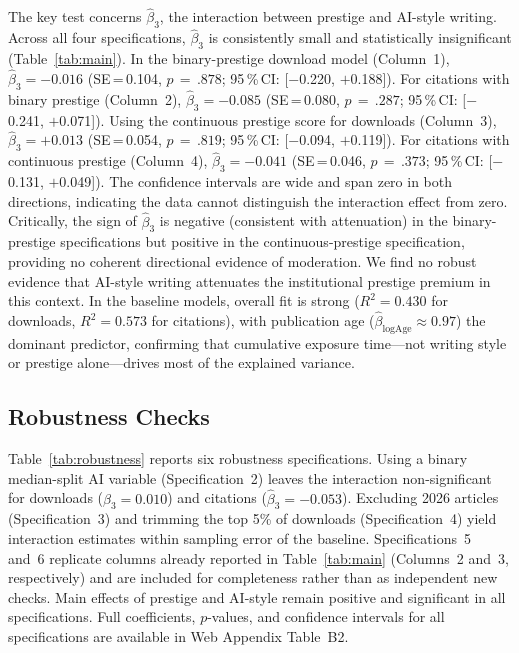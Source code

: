 \documentclass[12pt,a4paper]{article}
\begin{document}
The key test concerns $\hat{\beta}_3$, the interaction between prestige
and AI-style writing.
Across all four specifications, $\hat{\beta}_3$ is consistently small
and statistically insignificant (Table~\ref{tab:main}).
In the binary-prestige download model (Column~1),
$\hat{\beta}_3 = -0.016$ (SE\,=\,0.104, $p\,=\,.878$;
95\,\%\,CI: [$-$0.220, $+$0.188]).
For citations with binary prestige (Column~2),
$\hat{\beta}_3 = -0.085$ (SE\,=\,0.080, $p\,=\,.287$;
95\,\%\,CI: [$-$0.241, $+$0.071]).
Using the continuous prestige score for downloads (Column~3),
$\hat{\beta}_3 = +0.013$ (SE\,=\,0.054, $p\,=\,.819$;
95\,\%\,CI: [$-$0.094, $+$0.119]).
For citations with continuous prestige (Column~4),
$\hat{\beta}_3 = -0.041$ (SE\,=\,0.046, $p\,=\,.373$;
95\,\%\,CI: [$-$0.131, $+$0.049]).
The confidence intervals are wide and span zero in both directions,
indicating the data cannot distinguish the interaction effect from zero.
Critically, the sign of $\hat{\beta}_3$ is negative (consistent with
attenuation) in the binary-prestige specifications but positive in the
continuous-prestige specification, providing no coherent directional
evidence of moderation.
We find no robust evidence that AI-style writing attenuates the
institutional prestige premium in this context.
In the baseline models, overall fit is strong ($R^2 = 0.430$ for
downloads, $R^2 = 0.573$ for citations), with publication age
($\hat{\beta}_{\log\text{Age}}\approx 0.97$) the dominant predictor,
confirming that cumulative exposure time---not writing style or
prestige alone---drives most of the explained variance.

\subsection{Robustness Checks}

Table~\ref{tab:robustness} reports six robustness specifications.
Using a binary median-split AI variable (Specification~2) leaves
the interaction non-significant for downloads
($\hat{\beta}_3 = 0.010$) and citations ($\hat{\beta}_3 = -0.053$).
Excluding 2026 articles (Specification~3) and trimming the top 5\%
of downloads (Specification~4) yield interaction estimates within
sampling error of the baseline.
Specifications~5 and~6 replicate columns already reported in
Table~\ref{tab:main} (Columns~2 and~3, respectively) and are included
for completeness rather than as independent new checks.
Main effects of prestige and AI-style remain positive and significant
in all specifications.
Full coefficients, $p$-values, and confidence intervals for all
specifications are available in Web Appendix Table~B2.
\end{document}
